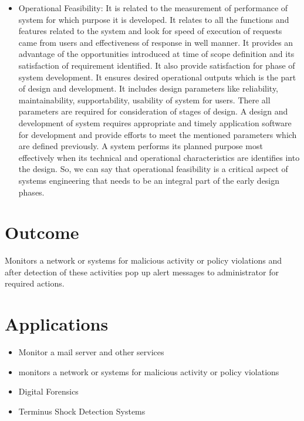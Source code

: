 \documentclass[12pt,a4paper]{report}
\begin{document}
\begin{itemize}
\begin{itemize}
\item	Operational Feasibility: It is related to the measurement of performance of system for which purpose it is developed. It relates to all the functions and features related to the system and look for speed of execution of requests came from users and effectiveness of response in well manner. It provides an advantage of the opportunities introduced at time of scope definition and its satisfaction of requirement identified. It also provide satisfaction for phase of system development.  It ensures desired operational outputs which is the part of design and development. It includes design parameters like reliability, maintainability, supportability, usability of system for users. There all parameters are required for consideration of stages of design. A design and development of system requires appropriate and timely application software for development and provide efforts to meet the mentioned parameters which are defined previously. A system performs its planned purpose most effectively when its technical and operational characteristics are identifies into the design. So, we can say that operational feasibility is a critical aspect of systems engineering that needs to be an integral part of the early design phases. 
\end{itemize}
\end{itemize}
\section{Outcome}
Monitors a network or systems for malicious activity or policy violations and after detection of these activities pop up alert messages to administrator for required actions.
\section{Applications}
\begin{itemize}
\item	Monitor a mail server and other services
\item	monitors a network or systems for malicious activity or policy violations
\item	Digital Forensics
\item	Terminus Shock Detection Systems
\end{itemize}
\newpage
\end{document}
